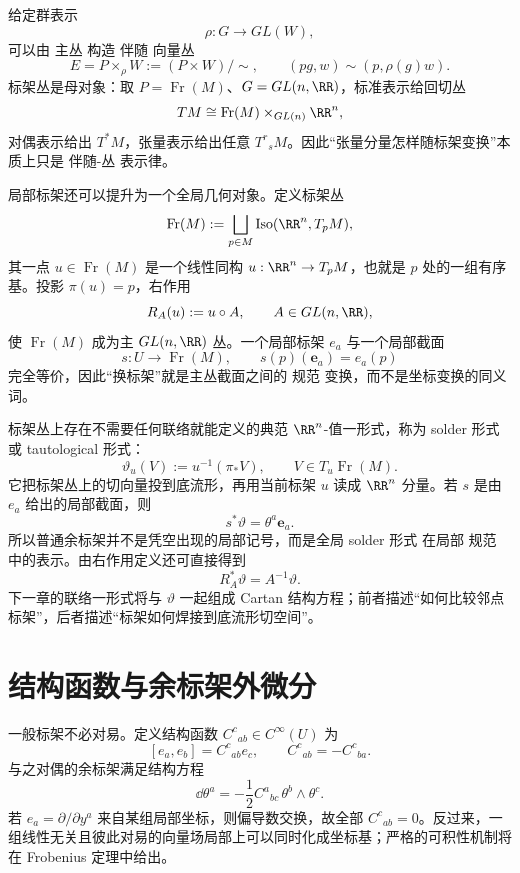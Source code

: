 给定群表示
\[
\rho:G\to GL(W),
\]
可以由 主丛 构造 伴随 向量丛
\begin{equation*}E=P\times_\rho W
:=(P\times W)/\sim,
\qquad
(pg,w)\sim(p,\rho(g)w).\end{equation*}
标架丛是母对象：取 $P=\operatorname{Fr}(M)$、$G=GL(n,\RR)$，标准表示给回切丛
\[
TM\cong\operatorname{Fr}(M)\times_{GL(n)}\RR^n,
\]
对偶表示给出 $T^*M$，张量表示给出任意 $T^r{}_sM$。因此“张量分量怎样随标架变换”本质上只是 伴随-丛 表示律。

局部标架还可以提升为一个全局几何对象。定义标架丛
\[
\operatorname{Fr}(M):=\bigsqcup_{p\in M}
\operatorname{Iso}(\RR^n,T_pM),
\]
其一点 $u\in\operatorname{Fr}(M)$ 是一个线性同构 $u:\RR^n\to T_pM$，也就是 $p$ 处的一组有序基。投影 $\pi(u)=p$，右作用
\[
R_A(u):=u\circ A,
\qquad A\in GL(n,\RR),
\]
使 $\operatorname{Fr}(M)$ 成为主 $GL(n,\RR)$ 丛。一个局部标架 $e_a$ 与一个局部截面
\[
s:U\to\operatorname{Fr}(M),
\qquad
s(p)(\mathbf e_a)=e_a(p)
\]
完全等价，因此“换标架”就是主丛截面之间的 规范 变换，而不是坐标变换的同义词。

标架丛上存在不需要任何联络就能定义的典范 $\RR^n$-值一形式，称为 solder 形式 或 tautological 形式：
\begin{equation*}\vartheta_u(V)
:=u^{-1}(\pi_*V),
\qquad
V\in T_u\operatorname{Fr}(M).\end{equation*}
它把标架丛上的切向量投到底流形，再用当前标架 $u$ 读成 $\RR^n$ 分量。若 $s$ 是由 $e_a$ 给出的局部截面，则
\begin{equation*}s^*\vartheta
 =\theta^a\mathbf e_a.\end{equation*}
所以普通余标架并不是凭空出现的局部记号，而是全局 solder 形式 在局部 规范 中的表示。由右作用定义还可直接得到
\begin{equation*}R_A^*\vartheta=A^{-1}\vartheta.\end{equation*}
下一章的联络一形式将与 $\vartheta$ 一起组成 Cartan 结构方程；前者描述“如何比较邻点标架”，后者描述“标架如何焊接到底流形切空间”。

\section{结构函数与余标架外微分}
一般标架不必对易。定义结构函数 $C^c{}_{ab}\in C^\infty(U)$ 为
\begin{equation}\label{eq:math-dg-synthesis-anholonomy}
[e_a,e_b]=C^c{}_{ab}e_c,
\qquad
C^c{}_{ab}=-C^c{}_{ba}.
\end{equation}
与之对偶的余标架满足结构方程
\begin{equation}\label{eq:math-dg-frame-structure-equation}
\boxed{\dd\theta^a=-\frac12 C^a{}_{bc}\,\theta^b\wedge\theta^c.}
\end{equation}
若 $e_a=\partial/\partial y^a$ 来自某组局部坐标，则偏导数交换，故全部 $C^c{}_{ab}=0$。反过来，一组线性无关且彼此对易的向量场局部上可以同时化成坐标基；严格的可积性机制将在 Frobenius 定理中给出。


